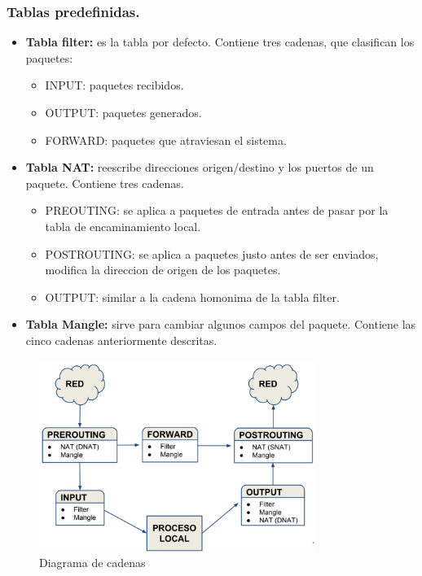 \begin{onepage}


\subsubsection{Tablas predefinidas.}
\begin{itemize}
    \item \textbf{Tabla filter: }es la tabla por defecto. Contiene tres cadenas, que clasifican los paquetes:
        \begin{itemize}
            \item INPUT: paquetes recibidos.
            \item OUTPUT: paquetes generados.
            \item FORWARD: paquetes que atraviesan el sistema.
        \end{itemize}
    
    \item \textbf{Tabla NAT: }reescribe direcciones origen/destino y los puertos de un paquete. Contiene tres cadenas.
            \begin{itemize}
                \item PREOUTING: se aplica a paquetes de entrada antes de pasar por la tabla de encaminamiento local.
                \item POSTROUTING: se aplica a paquetes justo antes de ser enviados, modifica la direccion de origen de los paquetes.
                \item OUTPUT: similar a la cadena homonima de la tabla filter.
            \end{itemize}
    \item \textbf{Tabla Mangle: }sirve para cambiar algunos campos del paquete. Contiene las cinco cadenas anteriormente descritas.
    \end{itemize}
    \begin{figure}[H]
        \centering
        \includegraphics[width=0.8\textwidth]{img/GraficoCadenas.PNG}
        \caption{Diagrama de cadenas}
    \end{figure}
    \end{onepage}

